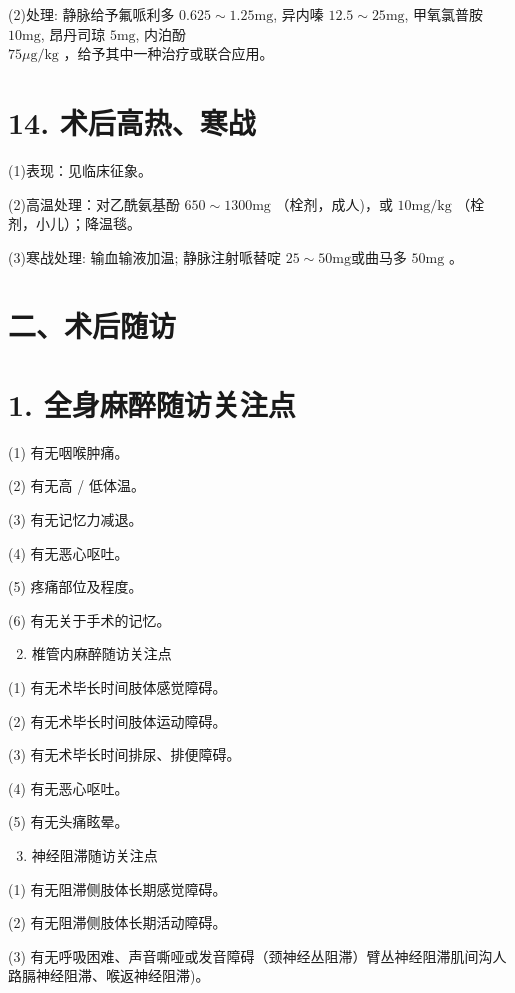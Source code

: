 \documentclass[10pt]{article}
\begin{document}
(2)处理: 静脉给予氟哌利多 $0.625 \sim 1.25 \mathrm{mg}$, 异内嗪 $12.5 \sim 25 \mathrm{mg}$, 甲氧氯普胺 $10 \mathrm{mg}$, 昂丹司琼 $5 \mathrm{mg}$, 内泊酚\\
$75 \mu \mathrm{g} / \mathrm{kg}$ ，给予其中一种治疗或联合应用。

\section*{14. 术后高热、寒战}
(1)表现：见临床征象。

(2)高温处理：对乙酰氨基酚 $650 \sim 1300 \mathrm{mg}$ （栓剂，成人)，或 $10 \mathrm{mg} / \mathrm{kg}$ （栓剂，小儿）；降温毯。

(3)寒战处理: 输血输液加温; 静脉注射哌替啶 $25 \sim 50 \mathrm{mg}$或曲马多 $50 \mathrm{mg}$ 。

\section*{二、术后随访}
\section*{1. 全身麻醉随访关注点}
(1) 有无咽喉肿痛。

(2) 有无高 / 低体温。

(3) 有无记忆力减退。

(4) 有无恶心呕吐。

(5) 疼痛部位及程度。

(6) 有无关于手术的记忆。

\begin{enumerate}
  \setcounter{enumi}{1}
  \item 椎管内麻醉随访关注点
\end{enumerate}

(1) 有无术毕长时间肢体感觉障碍。

(2) 有无术毕长时间肢体运动障碍。

(3) 有无术毕长时间排尿、排便障碍。

(4) 有无恶心呕吐。

(5) 有无头痛眩晕。

\begin{enumerate}
  \setcounter{enumi}{2}
  \item 神经阻滞随访关注点
\end{enumerate}

(1) 有无阻滞侧肢体长期感觉障碍。

(2) 有无阻滞侧肢体长期活动障碍。

(3) 有无呼吸困难、声音嘶哑或发音障碍（颈神经丛阻滞）臂丛神经阻滞肌间沟人路膈神经阻滞、喉返神经阻滞)。
\end{document}

